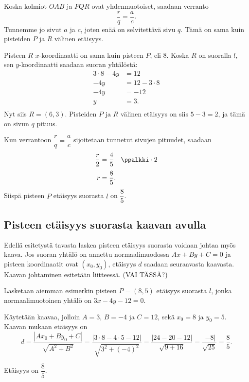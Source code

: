 Koska kolmiot $OAB$ ja $PQR$ ovat yhdenmuotoiset, saadaan verranto
\[
\frac{r}{q}=\frac{a}{c}.
\]
Tunnemme jo sivut $a$ ja $c$, joten enää on selvitettävä sivu $q$. Tämä on sama kuin pisteiden $P$ ja $R$ välinen etäisyys.

Pisteen $R$ $x$-koordinaatti on sama kuin pisteen $P$, eli 8. Koska $R$ on suoralla $l$, sen $y$-koordinaatti saadaan suoran yhtälöstä:
\begin{align*}
3\cdot 8-4y & =12 \\
-4y & =12-3\cdot 8 \\
-4y & =-12 \\
y & =3. \\
\end{align*}
Nyt siis $R=(6,3)$. Pisteiden $P$ ja $R$ välinen etäisyys on siis $5-3=2$, ja tämä on sivun $q$ pituus.

Kun verrantoon $\dfrac{r}{q}=\dfrac{a}{c}$ sijoitetaan tunnetut sivujen pituudet, saadaan
\begin{align*}
\frac{r}{2} & =\frac{4}{5} \quad \ppalkki \cdot 2 \\[3pt]
r & =\frac{8}{5}.
\end{align*}
Siispä pisteen $P$ etäisyys suorasta $l$ on $\dfrac{8}{5}$.

\subsection*{Pisteen etäisyys suorasta kaavan avulla}

Edellä esitetystä tavasta laskea pisteen etäisyys suorasta voidaan johtaa myös kaava.
Jos suoran yhtälö on annettu normaalimuodossa $Ax+By+C=0$ ja pisteen koordinaatit ovat $(x_0,y_0)$, etäisyys $d$ saadaan seuraavasta kaavasta.
Kaavan johtaminen esitetään liitteessä. (VAI TÄSSÄ?)

\begin{esimerkki} Lasketaan aiemman esimerkin pisteen $P=(8,5)$ etäisyys suorasta $l$, jonka normaalimuotoinen yhtälö on $3x-4y-12=0$.
\begin{esimratk}
Käytetään kaavaa, jolloin $A=3$, $B=-4$ ja $C=12$, sekä $x_0=8$ ja $y_0=5$. Kaavan mukaan etäisyys on
\[
d=\frac{|Ax_0+By_0+C|}{\sqrt{A^2+B^2}}
=\frac{|3\cdot 8-4\cdot 5-12|}{\sqrt{3^2+(-4)^2}}
=\frac{|24-20-12|}{\sqrt{9+16}}=\frac{|-8|}{\sqrt{25}}
=\frac{8}{5}.
\]
\end{esimratk}
\begin{esimvast}
Etäisyys on $\dfrac{8}{5}$.
\end{esimvast}
\end{esimerkki}


